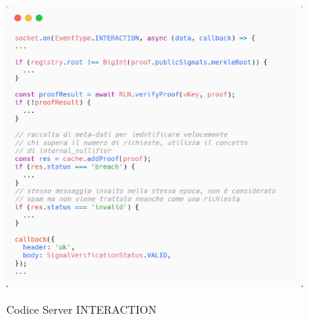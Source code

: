 \begin{figure}[H]
    \centering
    \includegraphics[width=10cm]{./chapters/3.poc/images/3.2.Server.png}
    \label{fig:2.Server}
    \captionsetup{justification=centering}
    \caption{Codice Server INTERACTION}
\end{figure}

